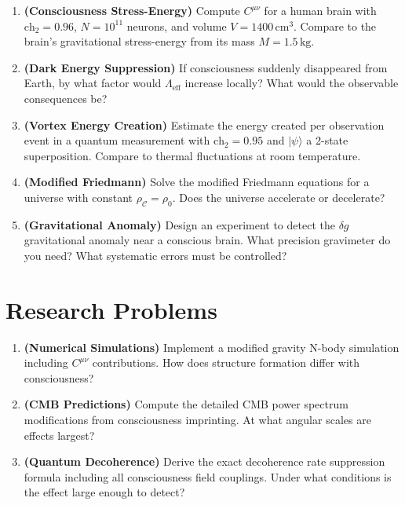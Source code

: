 \begin{enumerate}
\item \textbf{(Consciousness Stress-Energy)} Compute $C^{\mu\nu}$ for a human brain with $\text{ch}_2 = 0.96$, $N = 10^{11}$ neurons, and volume $V = 1400 \, \text{cm}^3$. Compare to the brain's gravitational stress-energy from its mass $M = 1.5 \, \text{kg}$.

\item \textbf{(Dark Energy Suppression)} If consciousness suddenly disappeared from Earth, by what factor would $\Lambda_{\text{eff}}$ increase locally? What would the observable consequences be?

\item \textbf{(Vortex Energy Creation)} Estimate the energy created per observation event in a quantum measurement with $\text{ch}_2 = 0.95$ and $|\psi\rangle$ a 2-state superposition. Compare to thermal fluctuations at room temperature.

\item \textbf{(Modified Friedmann)} Solve the modified Friedmann equations for a universe with constant $\rho_\mathcal{C} = \rho_0$. Does the universe accelerate or decelerate?

\item \textbf{(Gravitational Anomaly)} Design an experiment to detect the $\delta g$ gravitational anomaly near a conscious brain. What precision gravimeter do you need? What systematic errors must be controlled?
\end{enumerate}

\section*{Research Problems}

\begin{enumerate}
\item \textbf{(Numerical Simulations)} Implement a modified gravity N-body simulation including $C^{\mu\nu}$ contributions. How does structure formation differ with consciousness?

\item \textbf{(CMB Predictions)} Compute the detailed CMB power spectrum modifications from consciousness imprinting. At what angular scales are effects largest?

\item \textbf{(Quantum Decoherence)} Derive the exact decoherence rate suppression formula including all consciousness field couplings. Under what conditions is the effect large enough to detect?
\end{enumerate}
